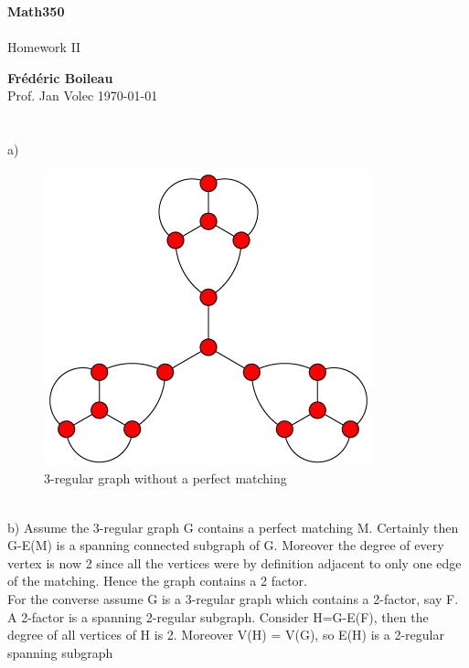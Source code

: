 \documentclass{article}
\begin{document}
	\begin{titlepage}
		\begin{center}
			\vspace*{1cm}
			\textbf{Math350}\\
			\\
			\vspace{0.5cm}
			Homework II
			
			\vspace{1.5cm}
			
			\textbf{Frédéric Boileau}\\
			\vspace{2cm}
			Prof. 
			Jan Volec
			\vfill
			\today
			\thispagestyle{empty}
		\end{center}
	\end{titlepage}
	\newpage
	\tableofcontents
	\thispagestyle{empty}
	\clearpage
	
	\section{}
	a)
	\begin{figure}[htbp!]
		\includegraphics[width = \textwidth]{cubic-unmatchable.png}
		\caption{3-regular graph without a perfect matching}
	\end{figure}\\[2ex]
	b)
	Assume the 3-regular graph G contains a perfect matching M. Certainly then G-E(M) is a spanning connected subgraph of G. Moreover the degree of every vertex is now 2 since all the vertices were by definition adjacent to only one edge of the matching. Hence the graph contains a 2 factor. \\
	For the converse assume G is a 3-regular graph which contains a 2-factor, say F. A 2-factor is a spanning 2-regular subgraph. Consider H=G-E(F), then the degree of all vertices of H is 2. Moreover V(H) = V(G), so E(H) is a 2-regular spanning subgraph   
	
\end{document}
